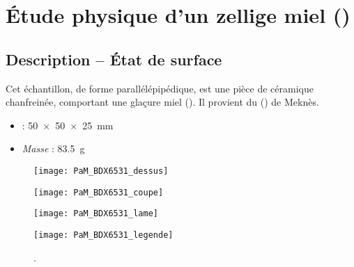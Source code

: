 
\chapter{Étude physique d'un zellige miel ()}

\section{Description -- État de surface}

Cet échantillon, de forme parallélépipédique, est une 
pièce de céramique chanfreinée, comportant une glaçure miel 
(). Il provient du \PaM () de Meknès.

\begin{itemize}
  \item \DimText : \SI{50x50x25}{\mm}
  \item \emph{Masse} : \SI{83.5}{\g}
\end{itemize}

\begin{figure}[htb]
  \begin{minipage}[b]{3.9cm}
    \centerfloat
    \vspace*{0pt}
    \texttt{[image: PaM\_BDX6531\_dessus]}

    \bigskip

    \texttt{[image: PaM\_BDX6531\_coupe]}
  \end{minipage}%
  \qquad%
  \begin{minipage}[b]{4.1cm}
    \centerfloat
    \vspace*{0pt}
    \texttt{[image: PaM\_BDX6531\_lame]}
  \end{minipage}
  \qquad%
  \begin{minipage}[b]{3.2cm}
    \vspace*{0pt}

    \texttt{[image: PaM\_BDX6531\_legende]}

    \bigskip
  \end{minipage}
  \caption[]{\legendeD.}
  \label{dessin:6531}
\end{figure}

